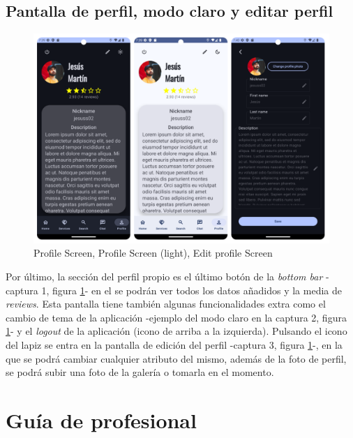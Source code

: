 \subsection{Pantalla de perfil, modo claro y editar perfil}
\begin{figure}[h]
	\centering
	\includegraphics[width = 1\textwidth]{Imagenes/capturasApp/profile_light_edit.png}
	\caption{Profile Screen, Profile Screen (light), Edit profile Screen}
	\label{fig:capApp5}
\end{figure}

Por último, la sección del perfil propio es el último botón de la \textit{bottom bar} -captura 1, figura \ref{fig:capApp5}- en el se podrán ver todos los datos añadidos y la media de \textit{reviews}. Esta pantalla tiene también algunas funcionalidades extra como el cambio de tema de  la aplicación -ejemplo del modo claro en la captura 2, figura \ref{fig:capApp5}- y el \textit{logout} de la aplicación (icono de arriba a la izquierda). Pulsando el icono del lapiz se entra en la pantalla de edición del perfil -captura 3, figura \ref{fig:capApp5}-, en la que se podrá cambiar cualquier atributo del mismo, además de la foto de perfil, se podrá subir una foto de la galería o tomarla en el momento.

\section{Guía de profesional}
\label{sec:guiaProf}
